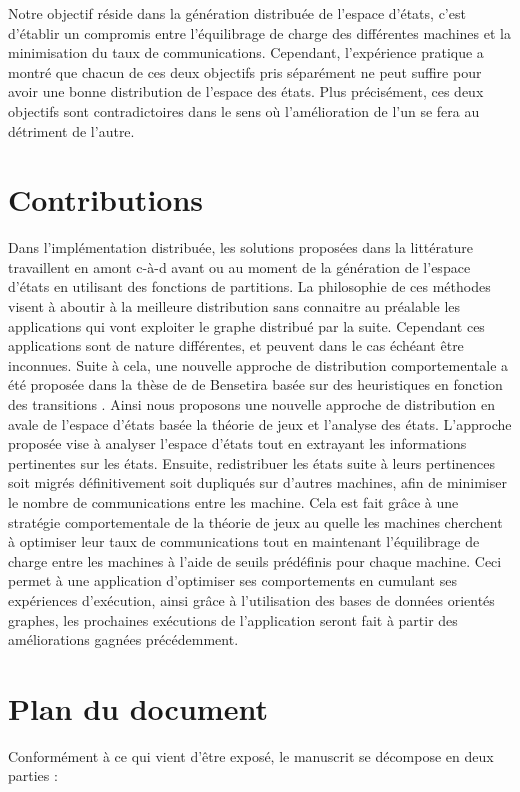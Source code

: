 Notre objectif réside dans la génération distribuée de l'espace d'états, c'est d’établir un compromis entre l’équilibrage de charge des différentes machines et la minimisation du taux de communications. Cependant, l’expérience pratique a montré que chacun de ces deux objectifs pris séparément ne peut suffire pour avoir une bonne distribution de l’espace des états. Plus précisément, ces deux objectifs sont contradictoires dans le sens où l'amélioration de l'un se fera au détriment de l'autre.

\section*{Contributions}

Dans l’implémentation distribuée, les solutions proposées dans la littérature travaillent en amont c-à-d avant ou au moment de la génération de l’espace d’états en utilisant des fonctions de partitions. La philosophie de ces méthodes visent à aboutir à la meilleure distribution sans connaitre au préalable les applications qui vont exploiter le graphe distribué par la suite. Cependant ces applications sont de nature différentes, et peuvent dans le cas échéant être inconnues. Suite à cela, une nouvelle approche de distribution comportementale a été proposée dans la thèse de de Bensetira basée sur des heuristiques en fonction des transitions \citep{BENSETIRA2017}. Ainsi nous proposons une nouvelle approche de distribution en avale de l'espace d'états basée la théorie de jeux et l'analyse des états. L’approche proposée vise à analyser l'espace d’états tout en extrayant les informations pertinentes sur les états. Ensuite, redistribuer les états suite à leurs pertinences soit migrés définitivement soit dupliqués sur d’autres machines, afin de minimiser le nombre de communications entre les machine. Cela est fait grâce à une stratégie comportementale de la théorie de jeux au quelle les machines cherchent à optimiser leur taux de communications tout en maintenant l'équilibrage de charge entre les machines à l’aide de seuils prédéfinis pour chaque machine. Ceci permet à une application d'optimiser ses comportements en cumulant ses expériences d’exécution, ainsi grâce à l'utilisation des bases de données orientés graphes, les prochaines exécutions de l’application seront fait à partir des améliorations gagnées précédemment.

\section*{Plan du document}
Conformément à ce qui vient d’être exposé, le manuscrit se décompose en deux parties :

